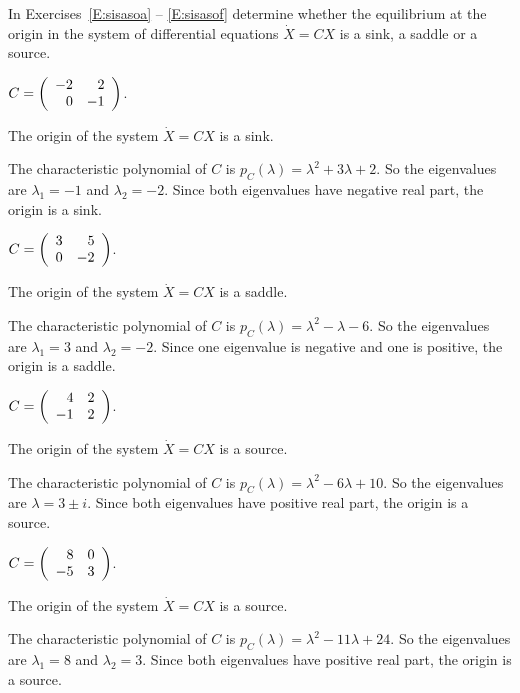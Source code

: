 \documentclass{ximera}
\begin{document}
\noindent In Exercises~\ref{E:sisasoa} -- \ref{E:sisasof} determine
whether the equilibrium at the origin in the system of differential
equations $\dot{X}=CX$ is a sink, a saddle or a source.
\begin{exercise} \label{E:sisasoa}
$C=\left(\begin{array}{rr} -2 & 2\\ 0 &-1\end{array}\right)$.

\begin{solution}
\ans The origin of the system $\dot{X} = CX$ is a sink.

\soln The characteristic polynomial of $C$ is
$p_C(\lambda) = \lambda^2 + 3\lambda + 2$.  So the eigenvalues are
$\lambda_1 = -1$ and $\lambda_2 = -2$.  Since both eigenvalues have
negative real part, the origin is a sink.

\end{solution}
\end{exercise}
\begin{exercise} \label{E:sisasob}
$C=\left(\begin{array}{rr} 3 & 5\\ 0 &-2\end{array}\right)$.

\begin{solution}
\ans The origin of the system $\dot{X} = CX$ is a saddle.

\soln The characteristic polynomial of $C$ is
$p_C(\lambda) = \lambda^2 - \lambda - 6$.  So the eigenvalues are
$\lambda_1 = 3$ and $\lambda_2 = -2$.  Since one eigenvalue is negative
and one is positive, the origin is a saddle.

\end{solution}
\end{exercise}
\begin{exercise} \label{E:sisasoc}
$C=\left(\begin{array}{rr} 4 & 2\\ -1 &2\end{array}\right)$.

\begin{solution}
\ans The origin of the system $\dot{X} = CX$ is a source.

\soln The characteristic polynomial of $C$ is
$p_C(\lambda) = \lambda^2 - 6\lambda + 10$.  So the eigenvalues are
$\lambda = 3 \pm i$.  Since both eigenvalues have positive real part,
the origin is a source.

\end{solution}
\end{exercise}
\begin{exercise} \label{E:sisasod}
$C=\left(\begin{array}{rr} 8 & 0\\ -5 &3\end{array}\right)$.

\begin{solution}
\ans The origin of the system $\dot{X} = CX$ is a source.

\soln The characteristic polynomial of $C$ is
$p_C(\lambda) = \lambda^2 - 11\lambda + 24$.  So the eigenvalues are
$\lambda_1 = 8$ and $\lambda_2 = 3$.  Since both eigenvalues have
positive real part, the origin is a source.

\end{solution}
\end{exercise}
\end{document}
